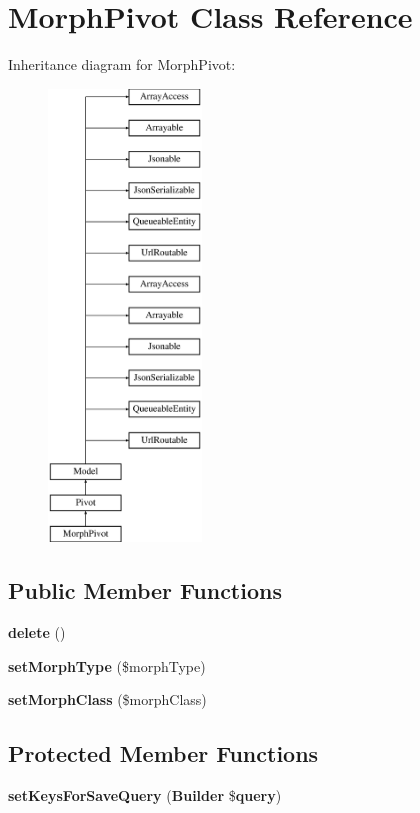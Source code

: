 \section{Morph\+Pivot Class Reference}
\label{class_illuminate_1_1_database_1_1_eloquent_1_1_relations_1_1_morph_pivot}
Inheritance diagram for Morph\+Pivot\+:\begin{figure}[H]
\begin{center}
\leavevmode
\includegraphics[height=12.000000cm]{class_illuminate_1_1_database_1_1_eloquent_1_1_relations_1_1_morph_pivot}
\end{center}
\end{figure}
\subsection*{Public Member Functions}
\begin{DoxyCompactItemize}
\item 
{\bf delete} ()
\item 
{\bf set\+Morph\+Type} (\$morph\+Type)
\item 
{\bf set\+Morph\+Class} (\$morph\+Class)
\end{DoxyCompactItemize}
\subsection*{Protected Member Functions}
\begin{DoxyCompactItemize}
\item 
{\bf set\+Keys\+For\+Save\+Query} ({\bf Builder} \${\bf query})
\end{DoxyCompactItemize}
